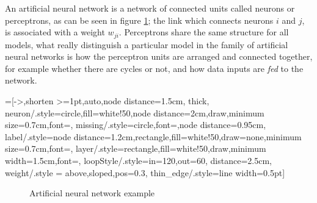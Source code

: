  
An artificial neural network is a network of connected units called neurons or perceptrons, as can be seen in figure \ref{fully_connected}; the link which connects neurons $i$ and $j$, is associated with a weight $w_{ji}$. Perceptrons share the same
structure for all models, what really distinguish a particular model in the family of artificial neural networks is how the perceptron units are arranged and connected together, for example whether there are cycles
or not, and how data inputs are \textit{fed} to the network. 


=[->,shorten >=1pt,auto,node distance=1.5cm,
  thick,
  neuron/.style={circle,fill=white!50,node distance=2cm,draw,minimum size=0.7cm,font=\sffamily\normalsize},
  missing/.style={circle,font=\sffamily\Large,node distance=0.95cm},
  label/.style={node distance=1.2cm,rectangle,fill=white!50,draw=none,minimum size=0.7cm,font=\sffamily\normalsize},
  layer/.style={rectangle,fill=white!50,draw,minimum width=1.5cm,font=\sffamily\Large},
  loopStyle/.style={in=120,out=60, distance=2.5cm},
  weight/.style = {above,sloped,pos=0.3},
  thin_edge/.style={line width=0.5pt}]
\begin{figure}[h]
 \centering
{}
\caption{Artificial neural network example}
\label{fully_connected}
\end{figure}


